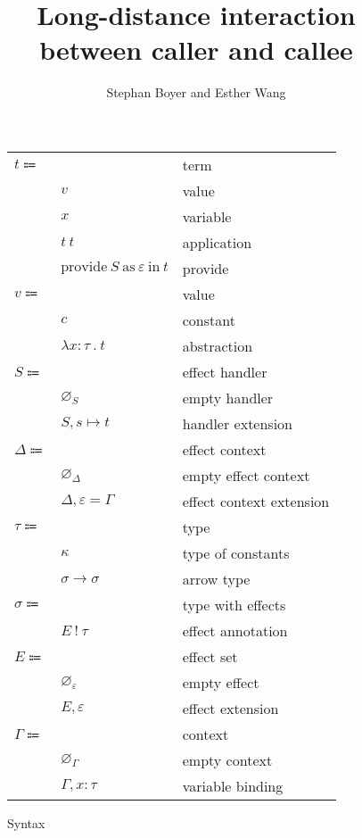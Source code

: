 \documentclass[12pt]{article}
\title{Long-distance interaction \\ between caller and callee}
\author{Stephan Boyer and Esther Wang}
\date{}
\newcommand\eterm{t}
\newcommand\evalue{v}
\newcommand\econst{c}
\newcommand\evar{x}
\newcommand\eabs[2]{\lambda #1 \ . \ #2}
\newcommand\eapp[2]{#1 \ #2}
\newcommand\eprovide[3]{\text{provide} \ #1 \ \text{as} \ #2 \ \text{in} \ #3}
\newcommand\pall{S}
\newcommand\pname{s}
\newcommand\pitem[2]{#1 \mapsto #2}
\newcommand\pempty{\varnothing_{\pall}}
\newcommand\pextend[2]{#1, #2}
\newcommand\ttype{\tau}
\newcommand\tconst{\kappa}
\newcommand\tarrow[2]{#1 \rightarrow #2}
\newcommand\tanno[2]{#1 : #2}
\newcommand\tx{\sigma}
\newcommand\twithx[2]{#1 \ ! \ #2}
\newcommand\xeffect{\varepsilon}
\newcommand\xeffects{E}
\newcommand\xempty{\varnothing_{\xeffect}}
\newcommand\xextend[2]{#1, #2}
\newcommand\xc{\Delta}
\newcommand\xcempty{\varnothing_{\xc}}
\newcommand\xcextend[2]{#1, #2}
\newcommand\xcitem[2]{#1 = #2}
\newcommand\ccontext{\Gamma}
\newcommand\cempty{\varnothing_{\ccontext}}
\newcommand\cextend[2]{#1, #2}
\begin{document}
  \maketitle

  \begin{figure}
    \begin{mdframed}
      \begin{center}
        \begin{tabular}{l l l}
          $\eterm \Coloneqq $ & & term \\
          & $\evalue$ & value \\
          & $\evar$ & variable \\
          & $\eapp{\eterm}{\eterm}$ & application \\
          & $\eprovide{\pall}{\xeffect}{\eterm}$ & provide \\
          $\evalue \Coloneqq $ & & value \\
          & $\econst$ & constant \\
          & $\eabs{\tanno{\evar}{\ttype}}{\eterm}$ & abstraction \\
          $\pall \Coloneqq$ & & effect handler \\
          & $\pempty$ & empty handler \\
          & $\pextend{\pall}{\pitem{\pname}{\eterm}}$ & handler extension \\
          $\xc \Coloneqq$ & & effect context \\
          & $\xcempty$ & empty effect context \\
          & $\xcextend{\xc}{\xcitem{\xeffect}{\ccontext}}$ & effect context extension \\
          $\ttype \Coloneqq$ & & type \\
          & $\tconst$ & type of constants \\
          & $\tarrow{\tx}{\tx}$ & arrow type \\
          $\tx \Coloneqq$ & & type with effects \\
          & $\twithx{\xeffects}{\ttype}$ & effect annotation \\
          $\xeffects \Coloneqq$ & & effect set \\
          & $\xempty$ & empty effect \\
          & $\xextend{\xeffects}{\xeffect}$ & effect extension \\
          $\ccontext \Coloneqq$ & & context \\
          & $\cempty$ & empty context \\
          & $\cextend{\ccontext}{\tanno{\evar}{\ttype}}$ & variable binding \\
        \end{tabular}
      \end{center}

      \caption{Syntax}
      \label{fig:syntax}
    \end{mdframed}
  \end{figure}
\end{document}
